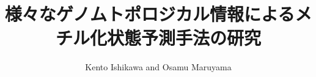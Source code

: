 \documentclass{article}
\begin{document}
    \title{様々なゲノムトポロジカル情報によるメチル化状態予測手法の研究}
    \author{Kento Ishikawa and Osamu Maruyama}
    \maketitle
\end{document}
